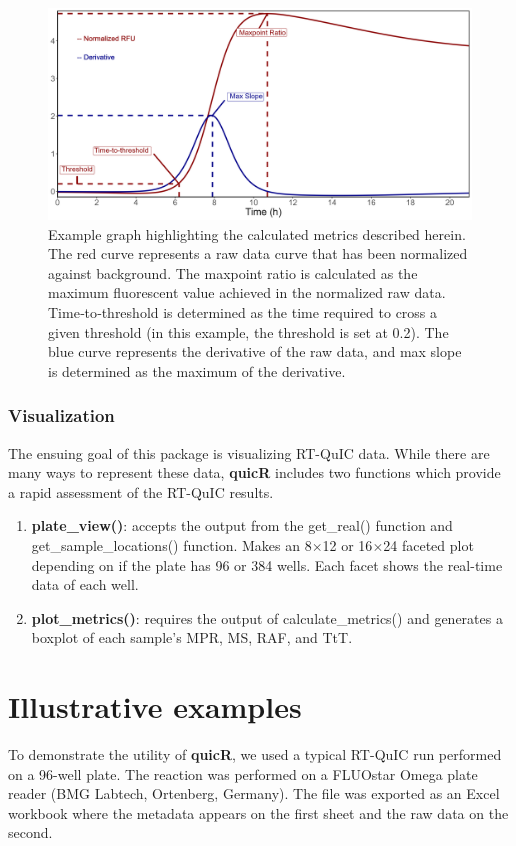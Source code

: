 \documentclass[preprint,12pt,a4paper]{elsarticle}
\begin{document}
\begin{figure}[ht]
\centering{}
\includegraphics[width=\textwidth]{images/metric_example.png}
\caption{Example graph highlighting the calculated metrics described herein. The red curve represents a raw data curve that has been normalized against background. The maxpoint ratio is calculated as the maximum fluorescent value achieved in the normalized raw data. Time‐to‐threshold is determined as the time required to cross a given threshold (in this example, the threshold is set at 0.2). The blue curve represents the derivative of the raw data, and max slope is determined as the maximum of the derivative.}
\label{fig:metrics}
\end{figure}

\subsubsection{Visualization}
The ensuing goal of this package is visualizing RT-QuIC data. While there are many ways to represent these data, \textbf{quicR} includes two functions which provide a rapid assessment of the RT-QuIC results.
\begin{enumerate}
\item \textbf{plate\_view()}: accepts the output from the get\_real() function and get\_sample\_locations() function. Makes an 8$\times$12 or 16$\times$24 faceted plot depending on if the plate has 96 or 384 wells. Each facet shows the real-time data of each well.
\item \textbf{plot\_metrics()}: requires the output of calculate\_metrics() and generates a boxplot of each sample's MPR, MS, RAF, and TtT.
\end{enumerate}

\section{Illustrative examples}
To demonstrate the utility of \textbf{quicR}, we used a typical RT-QuIC run performed on a 96-well plate. The reaction was performed on a FLUOstar Omega plate reader (BMG Labtech, Ortenberg, Germany). The file was exported as an Excel workbook where the metadata appears on the first sheet and the raw data on the second.
\end{document}
